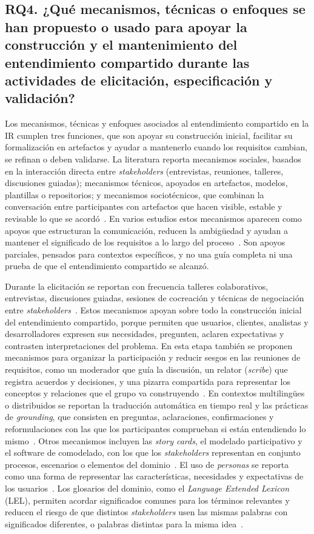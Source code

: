 \documentclass[12pt,letterpaper,oneside]{report}
\begin{document}
\subsection{RQ4. ¿Qué mecanismos, técnicas o enfoques se han propuesto o usado
para apoyar la construcción y el mantenimiento del entendimiento compartido
durante las actividades de elicitación, especificación y validación?}
Los mecanismos, técnicas y enfoques asociados al entendimiento compartido en
la IR cumplen tres funciones, que son apoyar su construcción inicial, facilitar
su formalización en artefactos y ayudar a mantenerlo cuando los requisitos
cambian, se refinan o deben validarse. La literatura reporta mecanismos
sociales, basados en la interacción directa entre \textit{stakeholders}
(entrevistas, reuniones, talleres, discusiones guiadas); mecanismos técnicos,
apoyados en artefactos, modelos, plantillas o repositorios; y mecanismos
sociotécnicos, que combinan la conversación entre participantes con artefactos
que hacen visible, estable y revisable lo que se
acordó~\cite{balasubramaniam2023}. En varios estudios estos mecanismos aparecen
como apoyos que estructuran la comunicación, reducen la ambigüedad y ayudan a
mantener el significado de los requisitos a lo largo del
proceso~\cite{sherif2023}. Son apoyos parciales, pensados para contextos específicos, y no
una guía completa ni una prueba de que el entendimiento compartido se alcanzó.

Durante la elicitación se reportan con frecuencia talleres colaborativos,
entrevistas, discusiones guiadas, sesiones de cocreación y técnicas de
negociación entre \textit{stakeholders}~\cite{martins2019}. Estos mecanismos
apoyan sobre todo la construcción inicial del entendimiento compartido, porque
permiten que usuarios, clientes, analistas y desarrolladores expresen sus
necesidades, pregunten, aclaren expectativas y contrasten interpretaciones del
problema. En esta etapa también se proponen mecanismos para organizar la
participación y reducir sesgos en las reuniones de requisitos, como un moderador
que guía la discusión, un relator (\textit{scribe}) que registra acuerdos y
decisiones, y una pizarra compartida para representar los conceptos y
relaciones que el grupo va construyendo~\cite{calefato2015}. En contextos
multilingües o distribuidos se reportan la traducción automática en tiempo real
y las prácticas de \textit{grounding}, que consisten en preguntas, aclaraciones,
confirmaciones y reformulaciones con las que los participantes comprueban si
están entendiendo lo mismo~\cite{calefato2015}. Otros mecanismos incluyen las
\textit{story cards}, el modelado participativo y el software de comodelado,
con los que los \textit{stakeholders} representan en conjunto procesos,
escenarios o elementos del dominio~\cite{devries2023}. El uso de
\textit{personas} se reporta como una forma de representar las
características, necesidades y expectativas de los
usuarios~\cite{wang2025personas}. Los glosarios del dominio, como el
\textit{Language Extended Lexicon} (LEL), permiten acordar significados comunes
para los términos relevantes y reducen el riesgo de que distintos
\textit{stakeholders} usen las mismas palabras con significados diferentes, o
palabras distintas para la misma idea~\cite{antonelli2016}.
\end{document}
